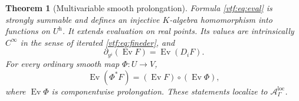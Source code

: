 \documentclass[11pt,letterpaper]{article}
\newtheorem{theorem}{Theorem}[section]
\theoremstyle{definition}
\theoremstyle{remark}
\newcommand{\A}{\mathscr A}\newcommand{\OO}{\mathcal O}\newcommand{\mm}{\mathfrak m}
\newcommand{\ev}{\operatorname{Ev}}\newcommand{\jet}{\operatorname{J}}
\newcommand{\halo}[1]{#1^{\mathrm h}}
\begin{document}
\begin{theorem}[Multivariable smooth prolongation]\label{vtf:thm:prolongation}
Formula \eqref{vtf:eq:eval} is strongly summable and defines an injective
$K$-algebra homomorphism into functions on $\halo U$. It extends evaluation
on real points. Its values are intrinsically $C^\infty$ in the sense of
iterated \eqref{vtf:eq:fineder}, and
\begin{equation}\label{vtf:eq:derbridge}
 \partial_{y^i}(\ev F)=\ev(D_iF).
\end{equation}
For every ordinary smooth map $\Phi:U\to V$,
\begin{equation}\label{vtf:eq:natural}
 \ev(\Phi^*F)=(\ev F)\circ(\ev\Phi),
\end{equation}
where $\ev\Phi$ is componentwise prolongation. These statements localize to
$\A^{\mathrm{loc}}_\Gamma$.
\end{theorem}
\end{document}
